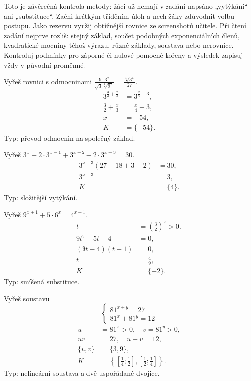 \documentclass[11pt,a4paper]{article}
\begin{document}
Toto je závěrečná kontrola metody: žáci už nemají v zadání napsáno „vytýkání“ ani „substituce“. Začni krátkým tříděním úloh a nech žáky zdůvodnit volbu postupu. Jako rezervu využij obtížnější rovnice ze screenshotů učitele.
Při čtení zadání nejprve rozliš: stejný základ, součet podobných exponenciálních členů, kvadratické mocniny téhož výrazu, různé základy, soustava nebo nerovnice. Kontroluj podmínky pro záporné či nulové pomocné kořeny a výsledek zapisuj vždy v původní proměnné.
\begin{prikladReseniBox}[title={Příklad 1}]
Vyřeš rovnici s odmocninami $\frac{9\cdot3^x}{\sqrt3\sqrt[3]{9^x}}=\frac{\sqrt[4]{3^x}}{27}$.
\tcblower
\[
\begin{aligned}3^{\frac{3}{2}+\frac{x}{3}}&=3^{\frac{x}{4}-3},\\\frac{3}{2}+\frac{x}{3}&=\frac{x}{4}-3,\\x&=-54,\\K&=\{-54\}.\end{aligned}
\]
Typ: převod odmocnin na společný základ.
\end{prikladReseniBox}
\begin{prikladReseniBox}[title={Příklad 2}]
Vyřeš $3^x-2\cdot3^{x-1}+3^{x-2}-2\cdot3^{x-3}=30$.
\tcblower
\[
\begin{aligned}3^{x-3}(27-18+3-2)&=30,\\3^{x-3}&=3,\\K&=\{4\}.\end{aligned}
\]
Typ: složitější vytýkání.
\end{prikladReseniBox}
\begin{prikladReseniBox}[title={Příklad 3}]
Vyřeš $9^{x+1}+5\cdot6^x=4^{x+1}$.
\tcblower
\[
\begin{aligned}t&=\left(\frac{3}{2}\right)^x>0,\\9t^2+5t-4&=0,\\(9t-4)(t+1)&=0,\\t&=\frac{4}{9},\\K&=\{-2\}.\end{aligned}
\]
Typ: smíšená substituce.
\end{prikladReseniBox}
\begin{prikladReseniBox}[title={Příklad 4}]
Vyřeš soustavu \[
\begin{cases}81^{x+y}=27\\81^x+81^y=12\end{cases}
\]
\tcblower
\[
\begin{aligned}u&=81^x>0,\quad v=81^y>0,\\uv&=27,\quad u+v=12,\\\{u,v\}&=\{3,9\},\\K&=\left\{\left[\frac{1}{4};\frac{1}{2}\right],\left[\frac{1}{2};\frac{1}{4}\right]\right\}.\end{aligned}
\]
Typ: nelineární soustava a dvě uspořádané dvojice.
\end{prikladReseniBox}
\end{document}
